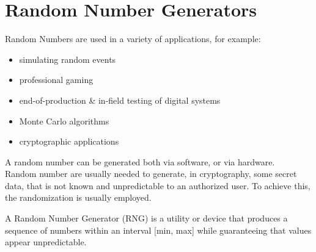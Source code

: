\chapter{Random Number Generators}
Random Numbers are used in a variety of applications, for example:
\begin{itemize}
  \item simulating random events
  \item professional gaming
  \item end-of-production \& in-field testing of digital systems
  \item Monte Carlo algorithms
  \item cryptographic applications
\end{itemize}
A random number can be generated both via software, or via hardware.\\
Random number are usually needed to generate, in cryptography, some secret data, that is not known 
and unpredictable to an authorized user. To achieve this, the randomization is usually employed.

\begin{boxH}
  A Random Number Generator (RNG) is a utility or device that produces a sequence of numbers 
  within an interval [min, max] while guaranteeing that values appear unpredictable.
\end{boxH}

